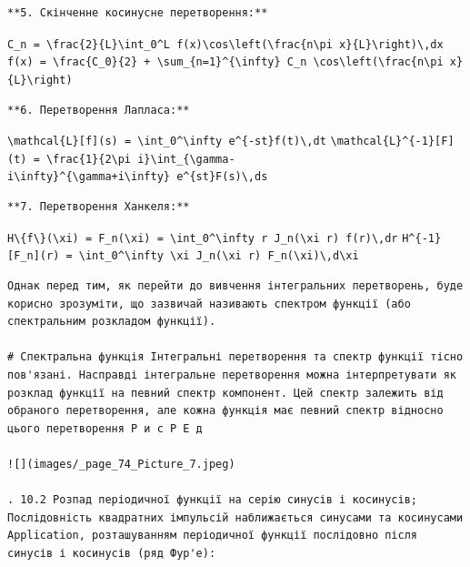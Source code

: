 \documentclass[
  ukrainian,
]{article}
\begin{document}
\begin{verbatim}
**5. Скінченне косинусне перетворення:**
\end{verbatim}

\texttt{C\_n\ =\ \textbackslash{}frac\{2\}\{L\}\textbackslash{}int\_0\^{}L\ f(x)\textbackslash{}cos\textbackslash{}left(\textbackslash{}frac\{n\textbackslash{}pi\ x\}\{L\}\textbackslash{}right)\textbackslash{},dx}
\texttt{f(x)\ =\ \textbackslash{}frac\{C\_0\}\{2\}\ +\ \textbackslash{}sum\_\{n=1\}\^{}\{\textbackslash{}infty\}\ C\_n\ \textbackslash{}cos\textbackslash{}left(\textbackslash{}frac\{n\textbackslash{}pi\ x\}\{L\}\textbackslash{}right)}

\begin{verbatim}
**6. Перетворення Лапласа:**
\end{verbatim}

\texttt{\textbackslash{}mathcal\{L\}{[}f{]}(s)\ =\ \textbackslash{}int\_0\^{}\textbackslash{}infty\ e\^{}\{-st\}f(t)\textbackslash{},dt}
\texttt{\textbackslash{}mathcal\{L\}\^{}\{-1\}{[}F{]}(t)\ =\ \textbackslash{}frac\{1\}\{2\textbackslash{}pi\ i\}\textbackslash{}int\_\{\textbackslash{}gamma-i\textbackslash{}infty\}\^{}\{\textbackslash{}gamma+i\textbackslash{}infty\}\ e\^{}\{st\}F(s)\textbackslash{},ds}

\begin{verbatim}
**7. Перетворення Ханкеля:**
\end{verbatim}

\texttt{H\textbackslash{}\{f\textbackslash{}\}(\textbackslash{}xi)\ =\ F\_n(\textbackslash{}xi)\ =\ \textbackslash{}int\_0\^{}\textbackslash{}infty\ r\ J\_n(\textbackslash{}xi\ r)\ f(r)\textbackslash{},dr}
\texttt{H\^{}\{-1\}{[}F\_n{]}(r)\ =\ \textbackslash{}int\_0\^{}\textbackslash{}infty\ \textbackslash{}xi\ J\_n(\textbackslash{}xi\ r)\ F\_n(\textbackslash{}xi)\textbackslash{},d\textbackslash{}xi}

\begin{verbatim}
Однак перед тим, як перейти до вивчення інтегральних перетворень, буде корисно зрозуміти, що зазвичай називають спектром функції (або спектральним розкладом функції).

# Спектральна функція Інтегральні перетворення та спектр функції тісно пов'язані. Насправді інтегральне перетворення можна інтерпретувати як розклад функції на певний спектр компонент. Цей спектр залежить від обраного перетворення, але кожна функція має певний спектр відносно цього перетворення Р и с Р Е д

![](images/_page_74_Picture_7.jpeg)

. 10.2 Розпад періодичної функції на серію синусів і косинусів; Послідовність квадратних імпульсій наближається синусами та косинусами Application, розташуванням періодичної функції послідовно після синусів і косинусів (ряд Фур'е):
\end{verbatim}
\end{document}
